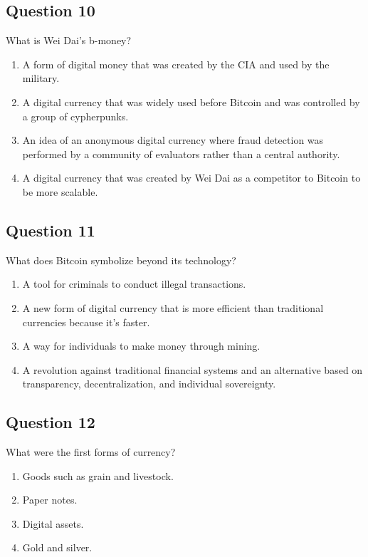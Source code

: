 \documentclass[12pt,a4paper]{article}
\begin{document}
\bigskip


\subsection*{Question 10}
What is Wei Dai's b-money?

\begin{enumerate}[label=\Alph*., leftmargin=*]
\item A form of digital money that was created by the CIA and used by the military.
\item A digital currency that was widely used before Bitcoin and was controlled by a group of cypherpunks.
\item An idea of an anonymous digital currency where fraud detection was performed by a community of evaluators rather than a central authority.
\item A digital currency that was created by Wei Dai as a competitor to Bitcoin to be more scalable.
\end{enumerate}

\bigskip


\subsection*{Question 11}
What does Bitcoin symbolize beyond its technology?

\begin{enumerate}[label=\Alph*., leftmargin=*]
\item A tool for criminals to conduct illegal transactions.
\item A new form of digital currency that is more efficient than traditional currencies because it's faster.
\item A way for individuals to make money through mining.
\item A revolution against traditional financial systems and an alternative based on transparency, decentralization, and individual sovereignty.
\end{enumerate}

\bigskip


\subsection*{Question 12}
What were the first forms of currency?

\begin{enumerate}[label=\Alph*., leftmargin=*]
\item Goods such as grain and livestock.
\item Paper notes.
\item Digital assets.
\item Gold and silver.
\end{enumerate}
\end{document}
